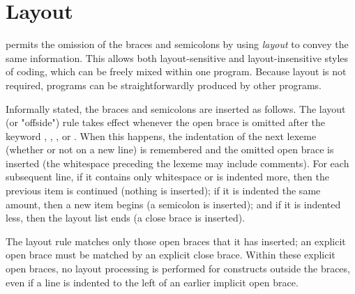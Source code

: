 \section{Layout} \label{layout}

\frege{} permits the omission of the braces and semicolons by using \emph{layout} to convey the same information.
This allows both layout-sensitive and layout-insensitive styles of coding, which can be freely mixed within one program.
Because layout is not required, \frege{} programs can be straightforwardly produced by other programs.

Informally stated, the braces and semicolons are inserted as follows.
The layout (or "offside") rule takes effect whenever the open brace is omitted after the keyword , , , or .
When this happens, the indentation of the next lexeme (whether or not on a new line) is remembered and the omitted open brace is inserted (the whitespace preceding the lexeme may include comments).
For each subsequent line, if it contains only whitespace or is indented more, then the previous item is continued (nothing is inserted);
if it is indented the same amount, then a new item begins (a semicolon is inserted);
and if it is indented less, then the layout list ends (a close brace is inserted).

The layout rule matches only those open braces that it has inserted; an explicit open brace must be matched by an explicit close brace.
Within these explicit open braces, no layout processing is performed for constructs outside the braces, even if a line is indented to the left of an earlier implicit open brace.

